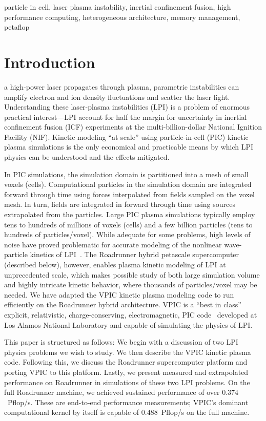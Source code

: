 \documentclass[journal,twoside]{IEEEtran}
\begin{document}
\begin{IEEEkeywords}
particle in cell,
laser plasma instability,
inertial confinement fusion,
high performance computing,
heterogeneous architecture,
memory management,
petaflop
\end{IEEEkeywords}

\section{Introduction}

 a high-power laser propagates through plasma,
parametric instabilities can amplify electron and ion density
fluctuations and scatter the laser light.  Understanding these
laser-plasma instabilities (LPI) is a problem of enormous practical
interest---LPI account for half the margin for uncertainty in inertial
confinement fusion (ICF) experiments at the multi-billion-dollar
National Ignition Facility (NIF).  Kinetic modeling ``at scale'' using
particle-in-cell (PIC) kinetic plasma simulations is the only
economical and practicable means by which LPI physics can be
understood and the effects mitigated.

In PIC simulations, the simulation domain is partitioned into a mesh
of small voxels (cells).  Computational particles in the simulation
domain are integrated forward through time using forces interpolated
from fields sampled on the voxel mesh.  In turn, fields are integrated
in forward through time using sources extrapolated from the particles.
Large PIC plasma simulations typically employ tens to hundreds of
millions of voxels (cells) and a few billion particles (tens to
hundreds of particles/voxel).  While adequate for some problems, high
levels of noise have proved problematic for accurate modeling of the
nonlinear wave-particle kinetics of
LPI~\cite{Yin_et_al_Phys_Plasmas_2006}.  The Roadrunner hybrid
petascale supercomputer (described below), however, enables plasma
kinetic modeling of LPI at unprecedented scale, which makes possible
study of both large simulation volume and highly intricate kinetic
behavior, where thousands of particles/voxel may be needed.  We have
adapted the VPIC kinetic plasma modeling code to run efficiently on
the Roadrunner hybrid architecture.  VPIC is a ``best in class''
explicit, relativistic, charge-conserving, electromagnetic, PIC
code~\cite{Bowers_et_al_Phys_Plasmas_2007} developed at Los Alamos
National Laboratory and capable of simulating the physics of LPI.

This paper is structured as follows: We begin with a discussion of two
LPI physics problems we wish to study.  We then describe the VPIC
kinetic plasma code.  Following this, we discuss the Roadrunner
supercomputer platform and porting VPIC to this platform.  Lastly, we
present measured and extrapolated performance on Roadrunner in
simulations of these two LPI problems.  On the full Roadrunner
machine, we achieved sustained performance of over $0.374$~Pflop/s.
These are end-to-end performance measurements; VPIC's dominant
computational kernel by itself is capable of $0.488$~Pflop/s on the
full machine.
\end{document}
